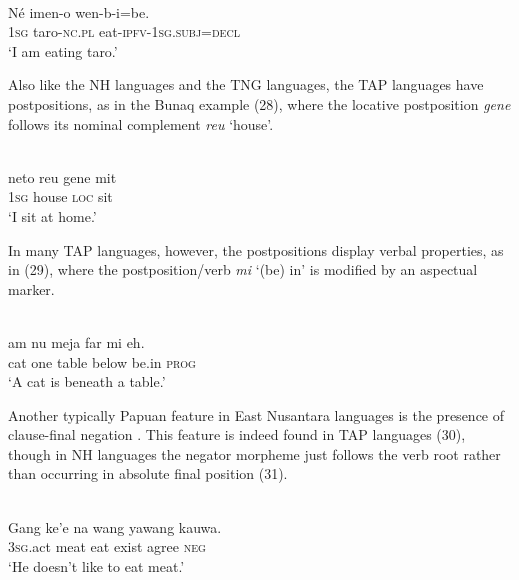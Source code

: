 \ea%
 \\
\gll  N\'e imen-o wen-b-i=be. \\
 \textsc{1sg} taro-\textsc{nc.pl} eat-\textsc{ipfv-1sg.subj=decl}  \\
\glt `I am eating taro.'
\z





Also like the NH languages and the TNG languages, the TAP languages have postpositions, as in the Bunaq example (28), where the locative postposition \textit{gene} follows its nominal complement \textit{reu} `house'.





 
\ea%
 \\
\gll   neto  reu  gene  mit\\ 
\textsc{1sg}  house  \textsc{loc}  sit\\  
\glt `I sit at home.'  \\

\z
 




In many TAP languages, however, the postpositions display verbal properties, as in (29), where the postposition/verb \textit{mi} `(be) in' is modified by an aspectual marker.


\ea%
 \\
\gll  {\textglotstop}am{\textopeno} nu meja far mi eh. \\
   cat one table below be.in \textsc{prog} \\
\glt `A cat is beneath a table.'
\z





Another typically Papuan feature in East Nusantara languages is the presence of clause-final negation \citep{KlamerEtAl2008}. This feature is indeed found in TAP languages (30), though in NH languages the negator morpheme just follows the verb root rather than occurring in absolute final position (31).


\ea%
 \\
\gll  Gang ke'e na wang yawang kauwa. \\
  \textsc{3sg}.act meat eat exist agree \textsc{neg} \\
\glt `He doesn't like to eat meat.'
\z






